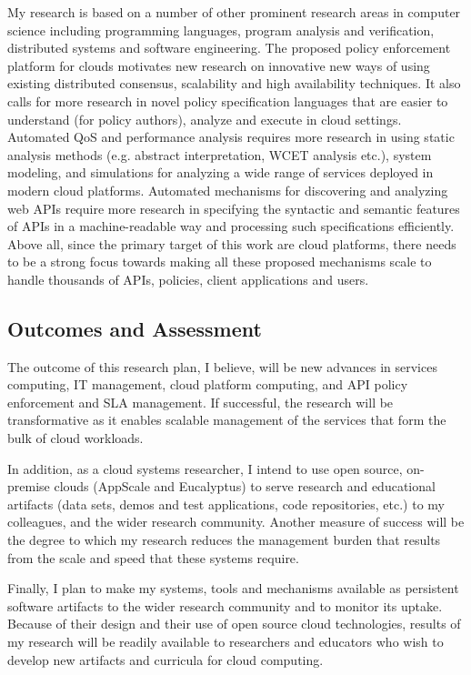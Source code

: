 My research is based on a number of other prominent research areas in computer
science including programming languages, program analysis and verification, 
distributed systems and software engineering. The proposed policy enforcement
platform for clouds motivates new research on innovative new ways of using existing
distributed consensus, scalability and high availability techniques. It also calls for
more research in novel policy specification languages that
are easier to understand (for policy authors), analyze and execute in cloud settings.
Automated QoS and performance analysis requires more research in using
static analysis methods (e.g. abstract interpretation, WCET analysis etc.), system modeling,
and simulations for analyzing a wide range of services deployed in modern cloud platforms.
Automated mechanisms for discovering and analyzing web APIs require more research
in specifying the syntactic and semantic features of APIs in a machine-readable way
and processing such specifications efficiently. Above all, since the primary target of this
work are cloud platforms, there needs to be a strong focus towards making all these 
proposed mechanisms scale to handle thousands of APIs, policies, client applications and users.

\subsection{Outcomes and Assessment}

The outcome of this research plan,
I believe, will be new advances in services computing, IT management, cloud
platform computing, and API policy enforcement and SLA management.
If successful, the research will be transformative as it
enables scalable management of the services that form the
bulk of cloud workloads.

In addition,
as a cloud systems researcher, I intend to use open source, on-premise clouds (AppScale
and Eucalyptus) to serve research and educational artifacts (data sets, demos and test applications, 
code repositories, etc.) to my colleagues, 
and the wider research community.  Another measure of success will
be the degree to which my research reduces the management burden that results from
the scale and speed that these systems require.

Finally, I plan to make my systems, tools and mechanisms available as persistent software artifacts to
the wider research community and to monitor its uptake.  Because of their design
and their use of open source cloud technologies, results of my research will be readily available
to researchers and educators who wish to develop new artifacts and curricula
for cloud computing. 